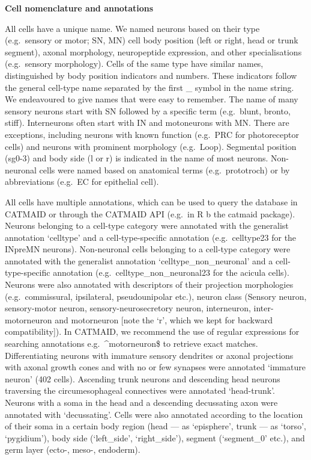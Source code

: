 \documentclass[
  11pt,
]{article}
\begin{document}
\textbf{Cell nomenclature and annotations}

All cells have a unique name. We named neurons based on their type
(e.g.~sensory or motor; SN, MN) cell body position (left or right, head
or trunk segment), axonal morphology, neuropeptide expression, and other
specialisations (e.g.~sensory morphology). Cells of the same type have
similar names, distinguished by body position indicators and numbers.
These indicators follow the general cell-type name separated by the
first \_ symbol in the name string. We endeavoured to give names that
were easy to remember. The name of many sensory neurons start with SN
followed by a specific term (e.g.~blunt, bronto, stiff). Interneurons
often start with IN and motoneurons with MN. There are exceptions,
including neurons with known function (e.g.~PRC for photoreceptor cells)
and neurons with prominent morphology (e.g.~Loop). Segmental position
(sg0-3) and body side (l or r) is indicated in the name of most neurons.
Non-neuronal cells were named based on anatomical terms
(e.g.~prototroch) or by abbreviations (e.g.~EC for epithelial cell).

All cells have multiple annotations, which can be used to query the
database in CATMAID or through the CATMAID API (e.g.~in R b the catmaid
package). Neurons belonging to a cell-type category were annotated with
the generalist annotation `celltype' and a cell-type-specific annotation
(e.g.~celltype23 for the INpreMN neurons). Non-neuronal cells belonging
to a cell-type category were annotated with the generalist annotation
`celltype\_non\_neuronal' and a cell-type-specific annotation
(e.g.~celltype\_non\_neuronal23 for the acicula cells). Neurons were
also annotated with descriptors of their projection morphologies
(e.g.~commissural, ipsilateral, pseudounipolar etc.), neuron class
(Sensory neuron, sensory-motor neuron, sensory-neurosecretory neuron,
interneuron, inter-motorneuron and motorneuron {[}note the `r', which we
kept for backward compatibility{]}). In CATMAID, we recommend the use of
regular expressions for searching annotations e.g.~\^{}motorneuron\$ to
retrieve exact matches. Differentiating neurons with immature sensory
dendrites or axonal projections with axonal growth cones and with no or
few synapses were annotated `immature neuron' (402 cells). Ascending
trunk neurons and descending head neurons traversing the
circumesophageal connectives were annotated `head-trunk'. Neurons with a
soma in the head and a descending decussating axon were annotated with
`decussating'. Cells were also annotated according to the location of
their soma in a certain body region (head --- as `episphere', trunk ---
as `torso', `pygidium'), body side (`left\_side', `right\_side'),
segment (`segment\_0' etc.), and germ layer (ecto-, meso-, endoderm).
\end{document}
